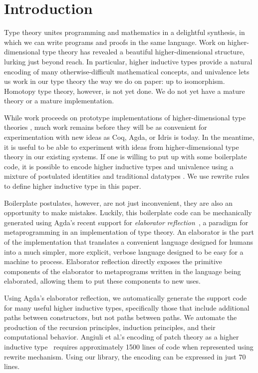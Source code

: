 \documentclass[runningheads]{llncs}
\begin{document}
\section{Introduction}
\label{sec:intro}

Type theory unites programming and mathematics in a delightful synthesis, in which we can write programs and proofs in the same language.
Work on higher-dimensional type theory has revealed a beautiful higher-dimensional structure, lurking just beyond reach.
In particular, higher inductive types provide a natural encoding of many otherwise-difficult mathematical concepts, and univalence lets us work in our type theory the way we do on paper: up to isomorphism.
Homotopy type theory, however, is not yet done.
We do not yet have a mature theory or a mature implementation.

While work proceeds on prototype implementations of higher-dimensional type theories \cite{cohen}\cite{Angiuli-2017}, much work remains before they will be as convenient for experimentation with new ideas as Coq, Agda, or Idris is today.
In the meantime, it is useful to be able to experiment with ideas from higher-dimensional type theory in our existing systems.
If one is willing to put up with some boilerplate code, it is possible to encode higher inductive types and univalence using a mixture of postulated identities and traditional datatypes \cite{Licata-2011}. We use rewrite rules to define higher inductive type in this paper.

Boilerplate postulates, however, are not just inconvenient, they are also an opportunity to make mistakes.
Luckily, this boilerplate code can be mechanically generated using Agda's recent support for \emph{elaborator reflection}~\cite{David-2016}, a paradigm for metaprogramming in an implementation of type theory.
An elaborator is the part of the implementation that translates a convenient language designed for humans into a much simpler, more explicit, verbose language designed to be easy for a machine to process.
Elaborator reflection directly exposes the primitive components of the elaborator to metaprograms written in the language being elaborated, allowing them to put these components to new uses.


Using Agda's elaborator reflection, we automatically generate the support code for many useful higher inductive types, specifically those that include additional paths between constructors, but not paths between paths. We automate the production of the recursion principles, induction principles, and their computational behavior.
Angiuli et al.'s encoding of patch theory as a higher inductive type~\cite{Angiuli-2014} requires approximately 1500 lines of code when represented using rewrite mechanism. Using our library, the encoding can be expressed in just 70 lines.
\end{document}
